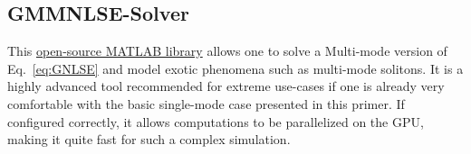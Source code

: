 \subsection*{GMMNLSE-Solver}
This \href{https://github.com/WiseLabAEP/GMMNLSE-Solver-FINAL}{open-source MATLAB library} allows one to solve a Multi-mode version of Eq.~\ref{eq:GNLSE} and model exotic phenomena such as multi-mode solitons. It is a highly advanced tool recommended for extreme use-cases if one is already very comfortable with the basic single-mode case presented in this primer. If configured correctly, it allows computations to be parallelized on the GPU, making it quite fast for such a complex simulation. 



